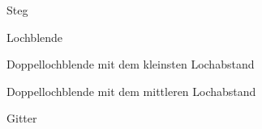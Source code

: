 \documentclass[12pt,a4paper,titlepage,headinclude,bibtotoc]{scrartcl}
\begin{document}
\begin{figure}[!htb]
	\centering
	
	\caption{Steg}
\end{figure}

\begin{figure}[!htb]
	\centering
	
	\caption{Lochblende}
\end{figure}

\begin{figure}[!htb]
	\centering
	
	\caption{Doppellochblende mit dem kleinsten Lochabstand}
\end{figure}

\begin{figure}[!htb]
	\centering
	
	\caption{Doppellochblende mit dem mittleren Lochabstand}
\end{figure}

\begin{figure}[!htb]
	\centering
	
	\caption{Gitter}
\end{figure}




\end{document}
